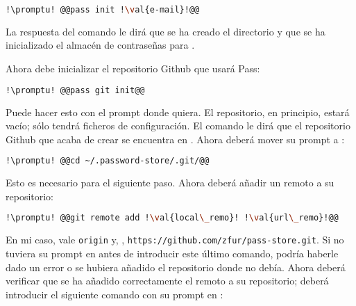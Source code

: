 \begin{lstlisting}[gobble=2,language=bash,style=bashinteract,escapechar=!]
  !\promptu! @@pass init !\val{e-mail}!@@
\end{lstlisting}

\noindent La respuesta del comando le dirá que se ha creado el directorio  y que se
ha inicializado el almacén de contraseñas para .

%
%
%
Ahora debe inicializar el repositorio Github que usará Pass:

\begin{lstlisting}[gobble=2,language=bash,style=bashinteract,escapechar=!]
  !\promptu! @@pass git init@@
\end{lstlisting}

\noindent Puede hacer esto con el prompt donde quiera. El repositorio, en principio, estará vacío; sólo tendrá
ficheros de configuración. El comando le dirá que el repositorio Github que acaba de crear se encuentra en
. Ahora deberá mover su prompt a :

\begin{lstlisting}[gobble=2,language=bash,style=bashinteract,escapechar=!]
  !\promptu! @@cd ~/.password-store/.git/@@
\end{lstlisting}

\noindent Esto es necesario para el siguiente paso. Ahora deberá añadir un remoto a su repositorio:

\begin{lstlisting}[gobble=2,language=bash,style=bashinteract,escapechar=!]
  !\promptu! @@git remote add !\val{local\_remo}! !\val{url\_remo}!@@
\end{lstlisting}

\noindent En mi caso,  vale \lstinline!origin! y, ,
\lstinline!https://github.com/zfur/pass-store.git!. Si no tuviera su prompt en 
antes de introducir este último comando, podría haberle dado un error o se hubiera añadido el repositorio donde
no debía. Ahora deberá verificar que se ha añadido correctamente el remoto a su repositorio; deberá introducir
el siguiente comando con su prompt en :

